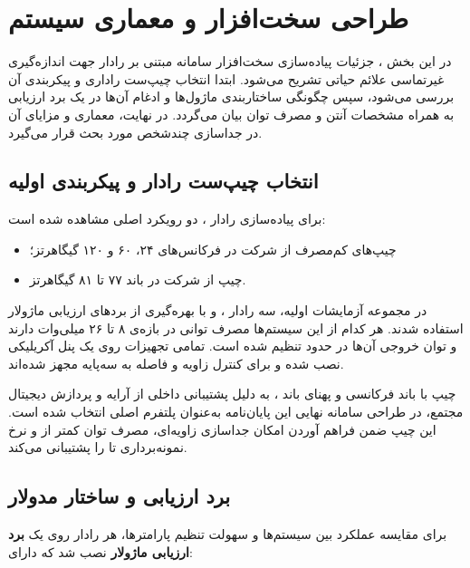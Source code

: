\section{طراحی سخت‌افزار و معماری سیستم}

در این بخش ، جزئیات پیاده‌سازی سخت‌افزار سامانه مبتنی بر رادار  جهت اندازه‌گیری غیرتماسی علائم حیاتی تشریح می‌شود. ابتدا انتخاب چیپ‌ست راداری و پیکربندی آن بررسی می‌شود، سپس چگونگی ساختاربندی ماژول‌ها و ادغام آن‌ها در یک برد ارزیابی به همراه مشخصات آنتن و مصرف توان بیان می‌گردد. در نهایت، معماری  و مزایای آن در جداسازی چندشخص مورد بحث قرار می‌گیرد.

\subsection{انتخاب چیپ‌ست رادار و پیکربندی اولیه}

برای پیاده‌سازی رادار ، دو رویکرد اصلی مشاهده شده است:

\begin{itemize}
  \item چیپ‌های کم‌مصرف  از شرکت  در فرکانس‌های ۲۴، ۶۰ و ۱۲۰ گیگاهرتز؛
  \item چیپ  از شرکت  در باند ۷۷ تا ۸۱  گیگاهرتز.
\end{itemize}
در مجموعه آزمایشات اولیه، سه رادار ،  و  با بهره‌گیری از بردهای ارزیابی ماژولار استفاده شدند. هر کدام از این سیستم‌ها مصرف توانی در بازه‌ی ۸ تا ۲۶ میلی‌وات دارند و توان خروجی آن‌ها در حدود  تنظیم شده است. تمامی تجهیزات روی یک پنل آکریلیکی نصب شده و برای کنترل زاویه و فاصله به سه‌پایه مجهز شده‌اند.
\cite{marty2024frequency}

چیپ  با باند فرکانسی  و پهنای باند ، به دلیل پشتیبانی داخلی از آرایه  و پردازش دیجیتال مجتمع، در طراحی سامانه نهایی این پایان‌نامه به‌عنوان پلتفرم اصلی انتخاب شده است. این چیپ ضمن فراهم آوردن امکان جداسازی زاویه‌ای، مصرف توان کمتر از  و نرخ نمونه‌برداری تا  را پشتیبانی می‌کند.
\cite{song2023multi}

\subsection{برد ارزیابی و ساختار مدولار}
\label{sec:eval-board-structure}

برای مقایسه عملکرد بین سیستم‌ها و سهولت تنظیم پارامترها، هر رادار روی یک \textbf{برد ارزیابی ماژولار} نصب شد که دارای:

